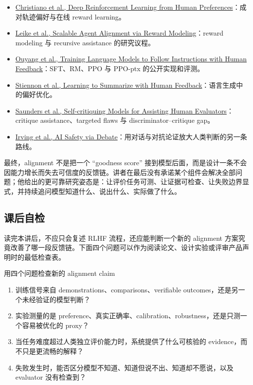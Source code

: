 \documentclass[a4paper]{article}
\begin{document}
\begin{itemize}
  \item \href{https://arxiv.org/abs/1706.03741}{Christiano et al., Deep Reinforcement Learning from Human Preferences}：成对轨迹偏好与在线 reward learning。
  \item \href{https://arxiv.org/abs/1811.07871}{Leike et al., Scalable Agent Alignment via Reward Modeling}：reward modeling 与 recursive assistance 的研究议程。
  \item \href{https://arxiv.org/abs/2203.02155}{Ouyang et al., Training Language Models to Follow Instructions with Human Feedback}：SFT、RM、PPO 与 PPO-ptx 的公开实现和评测。
  \item \href{https://arxiv.org/abs/2009.01325}{Stiennon et al., Learning to Summarize with Human Feedback}：语言生成中的偏好优化。
  \item \href{https://arxiv.org/abs/2206.05802}{Saunders et al., Self-critiquing Models for Assisting Human Evaluators}：critique assistance、targeted flaws 与 discriminator--critique gap。
  \item \href{https://arxiv.org/abs/1805.00899}{Irving et al., AI Safety via Debate}：用对话与对抗论证放大人类判断的另一条路线。
\end{itemize}

最终，alignment 不是把一个 ``goodness score'' 接到模型后面，而是设计一条不会因能力增长而失去可信度的反馈链。讲者在最后没有承诺某个组件会解决全部问题；他给出的更可靠研究姿态是：让评价任务可测、让证据可检查、让失败边界显式，并持续追问模型知道什么、说出什么、实际做了什么。

\subsection{课后自检}

读完本讲后，不应只会复述 RLHF 流程，还应能判断一个新的 alignment 方案究竟改善了哪一段反馈链。下面四个问题可以作为阅读论文、设计实验或评审产品声明时的最低检查表。

\begin{knowledgebox}{用四个问题检查新的 alignment claim}
\begin{enumerate}
  \item 训练信号来自 demonstrations、comparisons、verifiable outcomes，还是另一个未经验证的模型判断？
  \item 实验测量的是 preference、真实正确率、calibration、robustness，还是只测一个容易被优化的 proxy？
  \item 当任务难度超过人类独立评价能力时，系统提供了什么可核验的 evidence，而不只是更流畅的解释？
  \item 失败发生时，能否区分模型不知道、知道但说不出、知道却不愿说，以及 evaluator 没有检查到？
\end{enumerate}
\end{knowledgebox}
\end{document}
